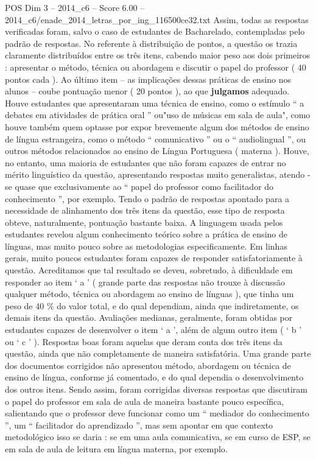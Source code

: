 \begin{textsample}{POS Dim 3 – 2014\_c6 – Score 6.00 – 2014\_c6/enade\_2014\_letras\_por\_ing\_116500ce32.txt}
Assim, todas as respostas verificadas foram, salvo o caso de estudantes de Bacharelado, contempladas pelo padrão de respostas.
No referente à distribuição de pontos, a questão os trazia claramente distribuídos entre os três itens, cabendo maior peso aos dois primeiros : apresentar o método, técnica ou abordagem e discutir o papel do professor ( 40 pontos cada ).
Ao último item – as implicações dessas práticas de ensino nos alunos – coube pontuação menor ( 20 pontos ), ao que \textbf{julgamos} adequado.
Houve estudantes que apresentaram uma técnica de ensino, como o estímulo “ a debates em atividades de prática oral ” ou"uso de músicas em sala de aula", como houve também quem optasse por expor brevemente algum dos métodos de ensino de língua estrangeira, como o método “ comunicativo ” ou o “ audiolingual ”, ou outros métodos relacionados ao ensino de Língua Portuguesa ( materna ).
Houve, no entanto, uma maioria de estudantes que não foram capazes de entrar no mérito linguístico da questão, apresentando respostas muito generalistas, atendo -se quase que exclusivamente ao “ papel do professor como facilitador do conhecimento ”, por exemplo.
Tendo o padrão de respostas apontado para a necessidade de alinhamento dos três itens da questão, esse tipo de resposta obteve, naturalmente, pontuação bastante baixa.
A linguagem usada pelos estudantes revelou algum conhecimento teórico sobre a prática de ensino de línguas, mas muito pouco sobre as metodologias especificamente.
Em linhas gerais, muito poucos estudantes foram capazes de responder satisfatoriamente à questão.
Acreditamos que tal resultado se deveu, sobretudo, à dificuldade em responder ao item ‘ a ’ ( grande parte das respostas não trouxe à discussão qualquer método, técnica ou abordagem ao ensino de línguas ), que tinha um peso de 40 \% do valor total, e do qual dependiam, ainda que indiretamente, os demais itens da questão.
Avaliações medianas, geralmente, foram obtidas por estudantes capazes de desenvolver o item ‘ a ’, além de algum outro item ( ‘ b ’ ou ‘ c ’ ).
Respostas boas foram aquelas que deram conta dos três itens da questão, ainda que não completamente de maneira satisfatória.
Uma grande parte dos documentos corrigidos não apresentou método, abordagem ou técnica de ensino de língua, conforme já comentado, e do qual dependia o desenvolvimento dos outros itens.
Sendo assim, foram corrigidas diversas respostas que discutiram o papel do professor em sala de aula de maneira bastante pouco específica, salientando que o professor deve funcionar como um “ mediador do conhecimento ”, um “ facilitador do aprendizado ”, mas sem apontar em que contexto metodológico isso se daria : se em uma aula comunicativa, se em curso de ESP, se em sala de aula de leitura em língua materna, por exemplo.

\end{textsample}
